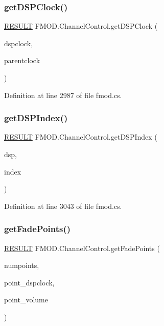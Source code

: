 \subsubsection{\texorpdfstring{get\+D\+S\+P\+Clock()}{getDSPClock()}}
{\footnotesize\ttfamily \hyperlink{namespace_f_m_o_d_a305d1176ef3f8c8815861a60407ac33d}{R\+E\+S\+U\+LT} F\+M\+O\+D.\+Channel\+Control.\+get\+D\+S\+P\+Clock (\begin{DoxyParamCaption}\item[{out ulong}]{dspclock,  }\item[{out ulong}]{parentclock }\end{DoxyParamCaption})}



Definition at line 2987 of file fmod.\+cs.

\mbox{\label{class_f_m_o_d_1_1_channel_control_aff759fada42a905928f965e759827791}} 
\subsubsection{\texorpdfstring{get\+D\+S\+P\+Index()}{getDSPIndex()}}
{\footnotesize\ttfamily \hyperlink{namespace_f_m_o_d_a305d1176ef3f8c8815861a60407ac33d}{R\+E\+S\+U\+LT} F\+M\+O\+D.\+Channel\+Control.\+get\+D\+S\+P\+Index (\begin{DoxyParamCaption}\item[{\hyperlink{class_f_m_o_d_1_1_d_s_p}{D\+SP}}]{dsp,  }\item[{out int}]{index }\end{DoxyParamCaption})}



Definition at line 3043 of file fmod.\+cs.

\mbox{\label{class_f_m_o_d_1_1_channel_control_a325febe78403a408ed6b505594fb101e}} 
\subsubsection{\texorpdfstring{get\+Fade\+Points()}{getFadePoints()}}
{\footnotesize\ttfamily \hyperlink{namespace_f_m_o_d_a305d1176ef3f8c8815861a60407ac33d}{R\+E\+S\+U\+LT} F\+M\+O\+D.\+Channel\+Control.\+get\+Fade\+Points (\begin{DoxyParamCaption}\item[{ref uint}]{numpoints,  }\item[{ulong \mbox{[}$\,$\mbox{]}}]{point\+\_\+dspclock,  }\item[{float \mbox{[}$\,$\mbox{]}}]{point\+\_\+volume }\end{DoxyParamCaption})}



